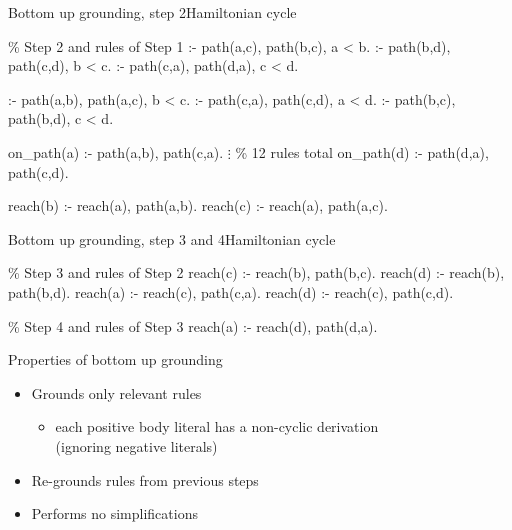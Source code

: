 \begin{frame}{Bottom up grounding, step 2}{Hamiltonian cycle}
  \vfill
\begin{SemiVerbatim}[\small]{.9}
{\color{comment}\% Step 2 \alert{and} rules of Step 1}
:- \alert{path(a,c)}, \alert{path(b,c)}, a < b.
:- \alert{path(b,d)}, \alert{path(c,d)}, b < c.
:- \alert{path(c,a)}, \alert{path(d,a)}, c < d.

:- \alert{path(a,b)}, \alert{path(a,c)}, b < c.
:- \alert{path(c,a)}, \alert{path(c,d)}, a < d.
:- \alert{path(b,c)}, \alert{path(b,d)}, c < d.

on_path(a) :- \alert{path(a,b)}, \alert{path(c,a)}.
           \(\vdots\) {\color{comment}\% 12 rules total}
on_path(d) :- \alert{path(d,a)}, \alert{path(c,d)}.

reach(b) :- \alert{reach(a)}, \alert{path(a,b)}.
reach(c) :- \alert{reach(a)}, \alert{path(a,c)}.
\end{SemiVerbatim}
\end{frame}
\begin{frame}{Bottom up grounding, step 3 and 4}{Hamiltonian cycle}
  \vfill
\begin{SemiVerbatim}{.9}
{\color{comment}\% Step 3 \alert{and} rules of Step 2}
reach(c) :- \alert{reach(b)}, path(b,c).
reach(d) :- \alert{reach(b)}, path(b,d).
reach(a) :- \alert{reach(c)}, path(c,a).
reach(d) :- \alert{reach(c)}, path(c,d).

{\color{comment}\% Step 4 \alert{and} rules of Step 3}
reach(a) :- \alert{reach(d)}, path(d,a).
\end{SemiVerbatim}
\end{frame}
\begin{frame}{Properties of bottom up grounding}
  \bigskip
  \begin{itemize}
  \item Grounds only \alert{relevant} rules
    \begin{itemize}\normalsize
    \item each positive body literal has a non-cyclic derivation \\
      (ignoring negative literals)
    \end{itemize}
    \smallskip
  \item \alert{Re-grounds} rules from previous steps


  \medskip
  \item Performs no \alert{simplifications}
  \end{itemize}
\end{frame}
